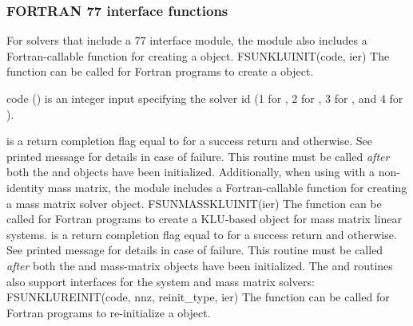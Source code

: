 \subsubsection*{FORTRAN 77 interface functions}
For solvers that include a {\F} 77 interface module, the {\sunlinsolklu}
module also includes a Fortran-callable function for creating a
 object.
%
%
{
  FSUNKLUINIT(code, ier)
}
{
  The function  can be called for Fortran programs
  to create a {\sunlinsolklu} object.
}
{
  \begin{args}[code]
  \item[code] ()
    is an integer input specifying the solver id (1 for {\cvode}, 2
    for {\ida}, 3 for {\kinsol}, and 4 for {\arkode}).
  \end{args}
}
{
   is a return completion flag equal to  for a success
  return and  otherwise. See printed message for details in case
  of failure.
}
{
  This routine must be
  called \emph{after} both the {\nvector} and {\sunmatrix} objects have
  been initialized.
}
Additionally, when using {\arkode} with a non-identity
mass matrix, the {\sunlinsolklu} module includes a Fortran-callable
function for creating a  mass matrix solver
object.
%
%
{
  FSUNMASSKLUINIT(ier)
}
{
  The function  can be called for Fortran programs
  to create a KLU-based  object for mass matrix linear
  systems.
}
{}
{
   is a  return completion flag equal to  for a success
  return and  otherwise. See printed message for details in case
  of failure.
}
{
  This routine must be
  called \emph{after} both the {\nvector} and {\sunmatrix} mass-matrix
  objects have been initialized.
}
The  and 
routines also support {\F} interfaces for the system and mass
matrix solvers:
%
%
{
  FSUNKLUREINIT(code, nnz, reinit\_type, ier)
}
{
  The function  can be called for Fortran programs
  to re-initialize a {\sunlinsolklu} object.
}

